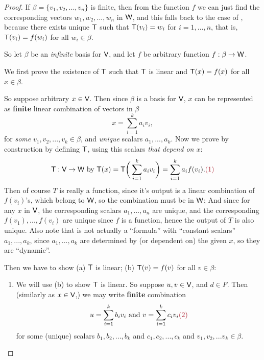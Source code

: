 \begin{proof}
If \(\beta = \{ v_1, v_2, ..., v_n \}\) is finite, then from the function \(f\) we can just find the corresponding vectors \(w_1, w_2, ..., w_n\) in \(\textsf{W}\),
and this falls back to the case of , because there exists unique \LTRAN{} \(\textsf{T}\) such that \(\textsf{T}(v_i) = w_i\) for \(i = 1, ..., n\),
that is, \(\textsf{T}(v_i) = f(w_i)\) for all \(w_i \in \beta\).

So let \(\beta\) be an \emph{infinite} basis for \(\textsf{V}\), and let \(f\) be arbitrary function \(f: \beta \to \textsf{W}\).

We first prove the existence of \(\textsf{T}\) such that \(\textsf{T}\) is linear and \(\textsf{T}(x) = f(x)\) for all \(x \in \beta\).

So suppose arbitrary \(x \in \textsf{V}\).
Then since \(\beta\) is a basis for \(\textsf{V}\), \(x\) can be represented as \textbf{finite} linear combination of vectors in \(\beta\)
\[
    x = \sum_{i = 1}^k a_i v_i,
\]
for \emph{some} \(v_1, v_2, ..., v_k \in \beta\), and \emph{unique} scalars \(a_1, ..., a_k\).
Now we prove by construction by defining \(\textsf{T}\), using this scalars \emph{that depend on \(x\)}:
\[
    \T : \V \to \W \text{ by } \T(x) = \T\bigg(\sum_{i = 1}^k a_i v_i\bigg) = \sum_{i = 1}^k a_i f(v_i). \MAROON{(1)}
\]
Then of course \(T\) is really a function, since
 it's output is a linear combination of \(f(v_i)\)'s, which belong to \(\textsf{W}\), so the combination must be in \(\textsf{W}\);
 And since for any \(x\) in \(\textsf{V}\), the corresponding scalars \(a_1, ..., a_n\) are unique, and the corresponding \(f(v_1), ..., f(v_i)\) are unique since \(f\) is a function, hence the output of \(T\) is also unique.
Also note that  is not actually a ``formula'' with ``constant scalars'' \(a_1, ..., a_k\), since \(a_1, ..., a_k\) are determined by (or dependent on) the given \(x\), so they are ``dynamic''.

Then we have to show (a) \(\textsf{T}\) is linear; (b) \(\textsf{T}(v) = f(v)\) for all \(v \in \beta\):
\begin{enumerate}
\item
We will use (b) to show \(\textsf{T}\) is linear.
So suppose \(u, v \in \textsf{V}\), and \(d \in F\).
Then (similarly as \(x \in \textsf{V}\),) we may write \textbf{finite} combination
\[
    u = \sum_{i = 1}^{k} b_i v_i \text{ and } v = \sum_{i = 1}^{k} c_i v_i \MAROON{(2)}
\]
for some (unique) scalars \(b_1, b_2, ..., b_k\) and \(c_1, c_2, ..., c_k\) and \(v_1, v_2, ... v_k \in \beta\).


\end{enumerate}
\end{proof}
